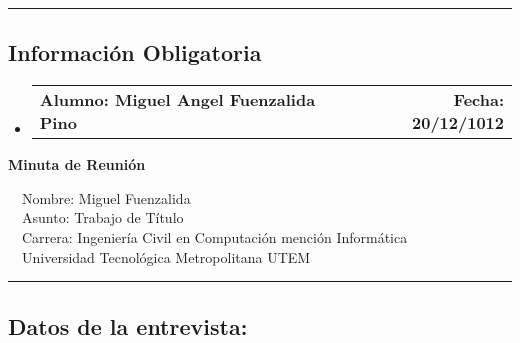 \documentclass[10pt,letterpaper]{article}
\makeatletter
\newcommand{\headerrow}[2]
{\begin{tabular*}{\linewidth}{l@{\extracolsep{\fill}}r}
	#1 &
	#2 \\
\end{tabular*}}
\makeatother
\begin{document}
\hrule
\vspace{-0.4em}
\subsection*{Información Obligatoria}

\begin{itemize}
	\parskip=0.1em

	\item 
	\headerrow
		{\textbf{Alumno: Miguel Angel Fuenzalida Pino}}
		{\textbf{Fecha: 20/12/1012}}

\end{itemize}
\newpage
\begin{center}
{\LARGE \textbf{Minuta de Reunión}}

\ \ \textbullet Nombre: Miguel Fuenzalida
\\
\ \ \textbullet Asunto: Trabajo de Título
\\
\ \ \textbullet Carrera: Ingeniería Civil en Computación mención Informática
\\
\ \ \textbullet Universidad Tecnológica Metropolitana UTEM
\end{center}

\hrule
\vspace{-0.4em}
\subsection*{Datos de la entrevista:}
\end{document}
